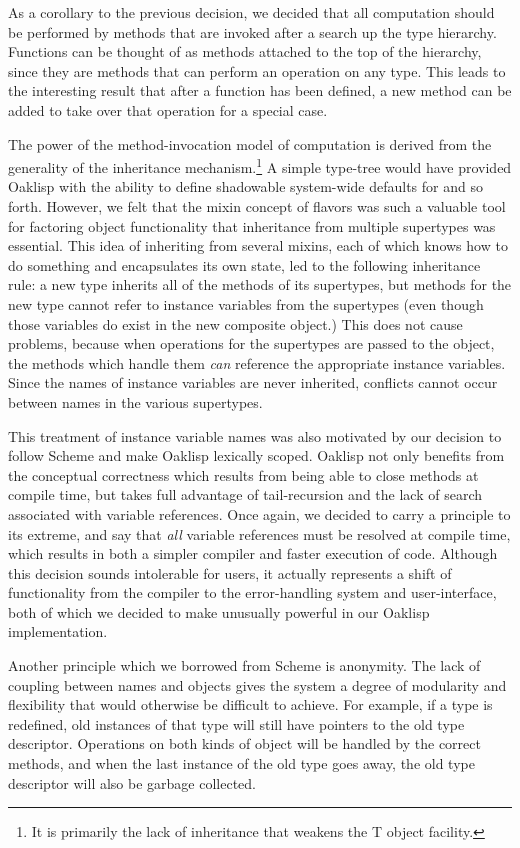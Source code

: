 As a corollary to the previous decision, we decided that all
computation should be performed by methods that are invoked after a
search up the type hierarchy.  Functions can be thought of as methods
attached to the top of the hierarchy, since they are methods that can
perform an operation on any type.  This leads to the interesting
result that after a function has been defined, a new method can be
added to take over that operation for a special case.

The power of the method-invocation model of computation is derived
from the generality of the inheritance mechanism.\footnote{It is
primarily the lack of inheritance that weakens the T object facility.}
A simple type-tree would have provided Oaklisp with the ability to
define shadowable system-wide defaults for  and so forth.
However, we felt that the mixin concept of flavors was such a valuable
tool for factoring object functionality that inheritance from multiple
supertypes was essential.  This idea of inheriting from several
mixins, each of which knows how to do something and encapsulates its
own state, led to the following inheritance rule: a new type inherits
all of the methods of its supertypes, but methods for the new type
cannot refer to instance variables from the supertypes (even though
those variables do exist in the new composite object.) This does not
cause problems, because when operations for the supertypes are passed
to the object, the methods which handle them {\it can} reference the
appropriate instance variables.  Since the names of instance variables
are never inherited, conflicts cannot occur between names in the
various supertypes.

This treatment of instance variable names was also motivated by our
decision to follow Scheme and make Oaklisp lexically scoped.  Oaklisp
not only benefits from the conceptual correctness which results from
being able to close methods at compile time, but takes full advantage
of tail-recursion and the lack of search associated with variable
references.  Once again, we decided to carry a principle to its
extreme, and say that {\it all} variable references must be resolved
at compile time, which results in both a simpler compiler and faster
execution of code.  Although this decision sounds intolerable for
users, it actually represents a shift of functionality from the
compiler to the error-handling system and user-interface, both of
which we decided to make unusually powerful in our Oaklisp
implementation.

Another principle which we borrowed from Scheme is anonymity.  The
lack of coupling between names and objects gives the system a degree
of modularity and flexibility that would otherwise be difficult to
achieve.  For example, if a type is redefined, old instances of that
type will still have pointers to the old type descriptor.  Operations
on both kinds of object will be handled by the correct methods, and
when the last instance of the old type goes away, the old type
descriptor will also be garbage collected.

